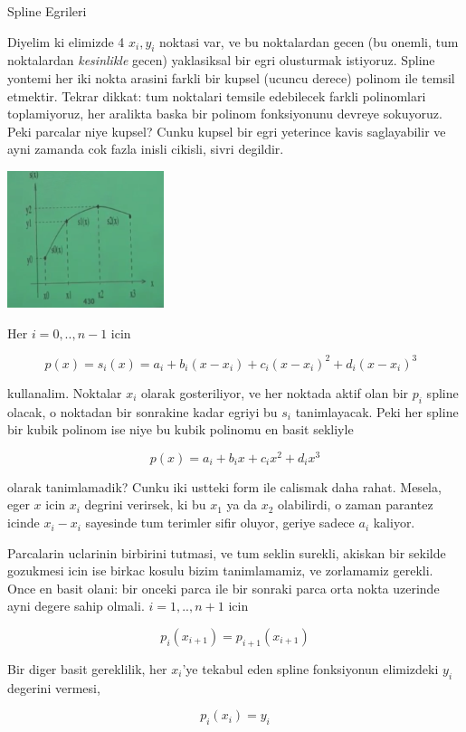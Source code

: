 \documentclass[12pt,fleqn]{article}\usepackage{../common}
\begin{document}
Spline Egrileri

Diyelim ki elimizde 4 $x_i,y_i$ noktasi var, ve bu noktalardan gecen (bu
onemli, tum noktalardan {\em kesinlikle} gecen) yaklasiksal bir egri
olusturmak istiyoruz. Spline yontemi her iki nokta arasini farkli bir
kupsel (ucuncu derece) polinom ile temsil etmektir. Tekrar dikkat: tum
noktalari temsile edebilecek farkli polinomlari toplamiyoruz, her aralikta
baska bir polinom fonksiyonunu devreye sokuyoruz. Peki parcalar niye
kupsel? Cunku kupsel bir egri yeterince kavis saglayabilir ve ayni zamanda
cok fazla inisli cikisli, sivri degildir.

\includegraphics[height=4cm]{spline1.png}

Her $i=0,..,n-1$ icin 

\[ p(x) = s_i(x) = a_i + b_i(x-x_i) + c_i(x-x_i)^2 + d_i(x-x_i)^3
\ \ \ \label{1}
\]

kullanalim. Noktalar $x_i$ olarak gosteriliyor, ve her noktada aktif olan
bir $p_i$ spline olacak, o noktadan bir sonrakine kadar egriyi bu $s_i$
tanimlayacak. Peki her spline bir kubik polinom ise niye bu kubik polinomu
en basit sekliyle 

\[ p(x) = a_i + b_ix + c_ix^2 + d_ix^3 \]

olarak tanimlamadik? Cunku iki ustteki form ile calismak daha
rahat. Mesela, eger $x$ icin $x_i$ degrini verirsek, ki bu $x_1$ ya da
$x_2$ olabilirdi, o zaman parantez icinde $x_i - x_i$ sayesinde tum terimler sifir
oluyor, geriye sadece $a_i$ kaliyor. 

Parcalarin uclarinin birbirini tutmasi, ve tum seklin surekli, akiskan bir
sekilde gozukmesi icin ise birkac kosulu bizim tanimlamamiz, ve zorlamamiz
gerekli. Once en basit olani: bir onceki parca ile bir sonraki parca
orta nokta uzerinde ayni degere sahip olmali. $i=1,..,n+1$ icin

\[ p_i (x_{i+1}) = p_{i+1}(x_{i+1}) \]

Bir diger basit gereklilik, her $x_i$'ye tekabul eden spline fonksiyonun
elimizdeki $y_i$ degerini vermesi,

\[ p_i(x_i) = y_i \]
\end{document}
